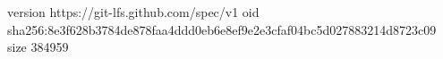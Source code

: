 version https://git-lfs.github.com/spec/v1
oid sha256:8e3f628b3784de878faa4ddd0eb6e8ef9e2e3cfaf04bc5d027883214d8723c09
size 384959
